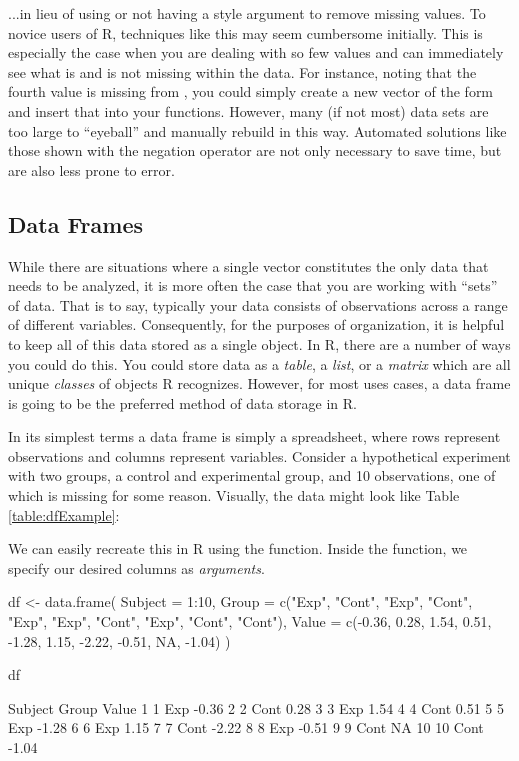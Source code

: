 ...in lieu of using or not having a  style argument to remove missing values.  To novice users of R, techniques like this may seem cumbersome initially.  This is especially the case when you are dealing with so few values and can immediately see what is and is not missing within the data. For instance, noting that the fourth value is missing from , you could simply create a new vector of the form  and insert that into your functions. However, many (if not most) data sets are too large to ``eyeball'' and manually rebuild in this way. Automated solutions like those shown with the negation operator are not only necessary to save time, but are also less prone to error.




\subsection{Data Frames}
\label{sec:data_frames}

While there are situations where a single vector constitutes the only data that needs to be analyzed, it is more often the case that you are working with ``sets'' of data.  That is to say, typically your data consists of observations across a range of different variables.  Consequently, for the purposes of organization, it is helpful to keep all of this data stored as a single object.  In R, there are a number of ways you could do this.  You could store data as a \textit{table}, a \textit{list}, or a \textit{matrix} which are all unique \textit{classes} of objects R recognizes. However, for most uses cases, a \gls{data frame} is going to be the preferred method of data storage in R.

In its simplest terms a data frame is simply a spreadsheet, where rows represent observations and columns represent variables. Consider a hypothetical experiment with two groups, a control and experimental group, and 10 observations, one of which is missing for some reason. Visually, the data might look like Table \ref{table:dfExample}: 

\medskip



\noindent
We can easily recreate this in R using the  function. Inside the function, we specify our desired columns as \textit{arguments}.

\begin{inR}
df <- data.frame(
  Subject = 1:10,
  Group = c("Exp", "Cont", "Exp", "Cont", "Exp", "Exp",
            "Cont", "Exp", "Cont", "Cont"),
  Value = c(-0.36,  0.28,  1.54,  0.51, -1.28,  1.15,
            -2.22, -0.51,  NA, -1.04)
)

df
\end{inR}
\begin{outR}
   Subject Group Value
1        1   Exp -0.36
2        2  Cont  0.28
3        3   Exp  1.54
4        4  Cont  0.51
5        5   Exp -1.28
6        6   Exp  1.15
7        7  Cont -2.22
8        8   Exp -0.51
9        9  Cont    NA
10      10  Cont -1.04
\end{outR}

